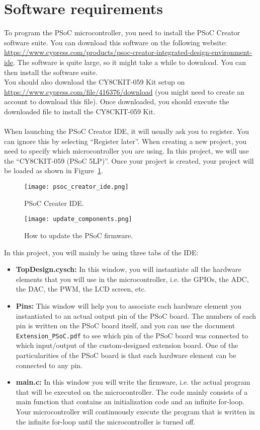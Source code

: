 \section{Software requirements}

To program the PSoC microcontroller, you need to install the PSoC Creator software suite. You can download this software on the following website: \\
\url{https://www.cypress.com/products/psoc-creator-integrated-design-environment-ide}. The software is quite large, so it might take a while to download. You can then install the software suite. \\
You should also download the CY8CKIT-059 Kit setup on \url{https://www.cypress.com/file/416376/download} (you might need to create an account to download this file). Once downloaded, you should execute the downloaded file to install the CY8CKIT-059 Kit.
\\
\\
When launching the PSoC Creator IDE, it will usually ask you to register. You can ignore this by selecting ``Register later''. When creating a new project, you need to specify which microcontroller you are using. In this project, we will use the ``CY8CKIT-059 (PSoC 5LP)''. Once your project is created, your project will be loaded as shown in Figure~\ref{fig:psoc_creator_ide}. 
\begin{figure}[h]
	\centering
	\texttt{[image: psoc\_creator\_ide.png]}
	\caption{PSoC Creater IDE. }
	\label{fig:psoc_creator_ide}
\end{figure}
\begin{figure}[h]
	\centering
	\texttt{[image: update\_components.png]}
	\caption{How to update the PSoC firmware. }
	\label{fig:update_components}
\end{figure}

In this project, you will mainly be using three tabs of the IDE: 
\begin{itemize}
	\item \textbf{TopDesign.cysch: } In this window, you will instantiate all the hardware elements that you will use in the microcontroller, i.e. the GPIOs, the ADC, the DAC, the PWM, the LCD screen, etc. 
	\item \textbf{Pins: } This window will help you to associate each hardware element you instantiated to an actual output pin of the PSoC board. The numbers of each pin is written on the PSoC board itself, and you can use the document \texttt{Extension\_PSoC.pdf} to see which pin of the PSoC board was connected to which input/output of the custom-designed extension board. One of the particularities of the PSoC board is that each hardware element can be connected to any pin. 
	\item \textbf{main.c: } In this window you will write the firmware, i.e. the actual program that will be executed on the microcontroller. The code mainly consists of a main function that contains an initialization code and an infinite for-loop. Your microcontroller will continuously execute the program that is written in the infinite for-loop until the microcontroller is turned off.  
\end{itemize}


